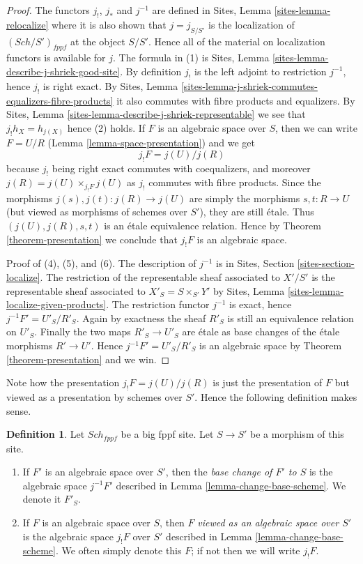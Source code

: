 \documentclass{stacks-project}
\theoremstyle{plain}
\theoremstyle{definition}
\newtheorem{definition}[subsection]{Definition}
\theoremstyle{remark}
\numberwithin{equation}{subsection}
\def\Sch{\mathit{Sch}}
\begin{document}
\begin{proof}
The functors $j_!$, $j_*$ and $j^{-1}$ are defined in
Sites, Lemma \ref{sites-lemma-relocalize}
where it is also shown that $j = j_{S/S'}$ is the localization
of $(\Sch/S')_{fppf}$ at the object $S/S'$. Hence
all of the material on localization functors is available for $j$.
The formula in (1) is
Sites, Lemma \ref{sites-lemma-describe-j-shriek-good-site}.
By definition $j_!$ is the left adjoint to restriction $j^{-1}$,
hence $j_!$ is right exact. By
Sites, Lemma \ref{sites-lemma-j-shriek-commutes-equalizers-fibre-products}
it also commutes with fibre products and equalizers.
By
Sites, Lemma \ref{sites-lemma-describe-j-shriek-representable}
we see that $j_!h_X = h_{j(X)}$ hence (2) holds.
If $F$ is an algebraic space over $S$, then we can write $F = U/R$
(Lemma \ref{lemma-space-presentation})
and we get
$$
j_!F = j(U)/j(R)
$$
because $j_!$ being right exact commutes with coequalizers, and moreover
$j(R) = j(U) \times_{j_!F} j(U)$ as $j_!$ commutes with fibre products.
Since the morphisms $j(s), j(t) : j(R) \to j(U)$ are simply the morphisms
$s, t : R \to U$ (but viewed as morphisms of schemes over $S'$), they
are still \'etale. Thus $(j(U), j(R), s, t)$ is an \'etale equivalence relation.
Hence by
Theorem \ref{theorem-presentation}
we conclude that $j_!F$ is an algebraic space.

\medskip\noindent
Proof of (4), (5), and (6). The description of $j^{-1}$ is in
Sites, Section \ref{sites-section-localize}.
The restriction of the representable sheaf associated to $X'/S'$
is the representable sheaf associated to
$X'_S = S \times_{S'} Y'$ by
Sites, Lemma \ref{sites-lemma-localize-given-products}.
The restriction functor $j^{-1}$ is exact, hence $j^{-1}F' = U'_S/R'_S$.
Again by exactness the sheaf $R'_S$ is still an equivalence relation on
$U'_S$. Finally the two maps $R'_S \to U'_S$ are \'etale as base changes
of the \'etale morphisms $R' \to U'$. Hence $j^{-1}F' = U'_S/R'_S$ is
an algebraic space by
Theorem \ref{theorem-presentation}
and we win.
\end{proof}

\noindent
Note how the presentation $j_!F = j(U)/j(R)$ is just the presentation
of $F$ but viewed as a presentation by schemes over $S'$. Hence the
following definition makes sense.

\begin{definition}
\label{definition-base-change}
Let $\Sch_{fppf}$ be a big fppf site.
Let $S \to S'$ be a morphism of this site.
\begin{enumerate}
\item If $F'$ is an algebraic space over $S'$, then the
{\it base change of $F'$ to $S$} is the
algebraic space $j^{-1}F'$ described in
Lemma \ref{lemma-change-base-scheme}. We denote it $F'_S$.
\item If $F$ is an algebraic space over $S$, then $F$
{\it viewed as an algebraic space over $S'$}
is the algebraic space $j_!F$ over $S'$ described in
Lemma \ref{lemma-change-base-scheme}. We often simply denote this
$F$; if not then we will write $j_!F$.
\end{enumerate}
\end{definition}
\end{document}
